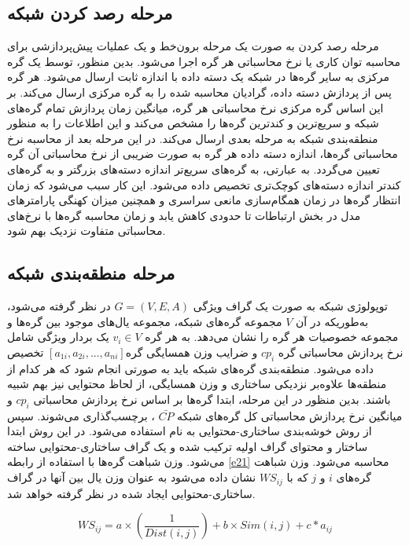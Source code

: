 \subsection{مرحله رصد کردن شبکه}
مرحله رصد کردن به صورت یک مرحله برون‌خط و یک عملیات پیش‌پردازشی برای محاسبه توان کاری یا نرخ محاسباتی هر گره اجرا می‌شود. بدین منظور، توسط یک گره مرکزی به سایر گره‌ها در شبکه یک دسته داده با اندازه ثابت ارسال می‌شود. هر گره‌ پس از پردازش دسته داده، گرادیان محاسبه شده را به گره مرکزی ارسال می‌کند. بر این اساس گره مرکزی نرخ محاسباتی هر گره، میانگین زمان پردازش تمام گره‌های شبکه و سریع‌ترین و کندترین گره‌ها را مشخص می‌کند و این اطلاعات را به منظور منطقه‌بندی شبکه به مرحله بعدی ارسال می‌کند. 
در این مرحله بعد از محاسبه نرخ محاسباتی گره‌ها، اندازه دسته داده هر گره به صورت ضریبی از نرخ محاسباتی آن گره تعیین می‌گردد. به عبارتی، به گره‌های سریع‌تر اندازه دسته‌های بزرگتر و به گره‌های کندتر اندازه دسته‌های کوچک‌تری تخصیص داده می‌شود. این کار سبب می‌شود که زمان انتظار گره‌ها در زمان همگام‌سازی مانعی سراسری و همچنین میزان کهنگی پارامترهای مدل در بخش ارتباطات تا حدودی کاهش یابد و زمان محاسبه گره‌ها با نرخ‌های محاسباتی متفاوت نزدیک بهم شود. 


\subsection{مرحله منطقه‌بندی شبکه}
توپولوژی شبکه به صورت یک گراف ویژگی $G=(V,E,A)$ در نظر گرفته می‌شود، به‌طوریکه در آن $V$  مجموعه گره‌های شبکه،  مجموعه یال‌های موجود بین گره‌ها و  مجموعه خصوصیات هر گره را نشان می‌دهد. به هر گره $v_i\in V$ یک بردار ویژگی شامل نرخ پردازش محاسباتی گره $cp_i$ و ضرایب وزن همسایگی گره$[a_{1i},a_{2i},...,a_{ni}]$ تخصیص داده می‌شود. منطقه‌بندی گره‌های شبکه باید به صورتی انجام شود که هر کدام از منطقه‌ها علاوه‌بر نزدیکی ساختاری و وزن همسایگی، از لحاظ محتوایی نیز بهم شبیه باشند. بدین منظور در این مرحله، ابتدا گره‌ها بر اساس نرخ پردازش محاسباتی $cp_i$ و میانگین نرخ پردازش محاسباتی کل گره‌های شبکه $\bar{CP}$ ، برچسب‌گذاری می‌شوند. سپس از روش خوشه‌بندی ساختاری-محتوایی به نام  \cite{Kesh2020} استفاده می‌شود. در این روش ابتدا ساختار و محتوای گراف اولیه ترکیب شده و یک گراف ساختاری-محتوایی ساخته می‌شود. وزن شباهت گره‌ها با استفاده از رابطه \ref{e21} محاسبه می‌شود. وزن شباهت گره‌های $i$ و $j$ که با $WS_{ij}$ نشان داده می‌شود به عنوان وزن یال بین آنها در گراف ساختاری-محتوایی ایجاد شده در نظر گرفته خواهد شد.

\begin{equation}\label{e21}
	WS_{ij}=a\times (\frac{1}{Dist(i,j)})+b\times Sim(i,j)+c*a_{ij}
\end{equation}

